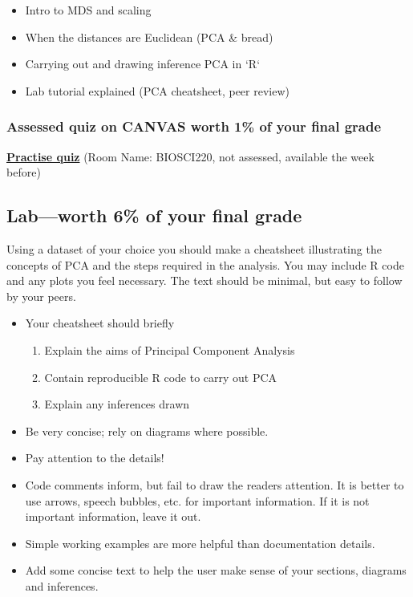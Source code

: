 \documentclass{article}
\begin{document}
\begin{itemize}
\item Intro to MDS and scaling
\item When the distances are Euclidean (PCA \& bread)
\item Carrying out and drawing inference PCA in `R`
\item Lab tutorial explained (PCA cheatsheet, peer review)
\end{itemize}

\subsubsection*{Assessed quiz on CANVAS worth 1\% of your final grade}

\begin{center}
  \href{https://b.socrative.com/login/student/}{\textbf{\Large Practise quiz}} (Room Name: BIOSCI220, not assessed, available the week before)
  
\end{center}



\subsection*{Lab---worth 6\% of your final grade}

Using a dataset of your choice you should make a cheatsheet illustrating the concepts of PCA and the steps required in the analysis. You may include R code and any plots you feel necessary. The text should be minimal, but easy to follow by your peers. 

\begin{itemize}

\item Your cheatsheet should briefly
  \begin{enumerate}
  \item Explain the aims of Principal Component Analysis
  \item Contain reproducible R code to carry out PCA
  \item Explain any inferences drawn
  \end{enumerate}
  
\item Be very concise; rely on diagrams where possible.

\item Pay attention to the details!

\item Code comments inform, but fail to draw the readers attention. It is better to use arrows, speech bubbles, etc. for important information. If it is not important information, leave it out.

\item Simple working examples are more helpful than documentation details.

\item Add some concise text to help the user make sense of your sections, diagrams and inferences.
\end{itemize}
\end{document}
